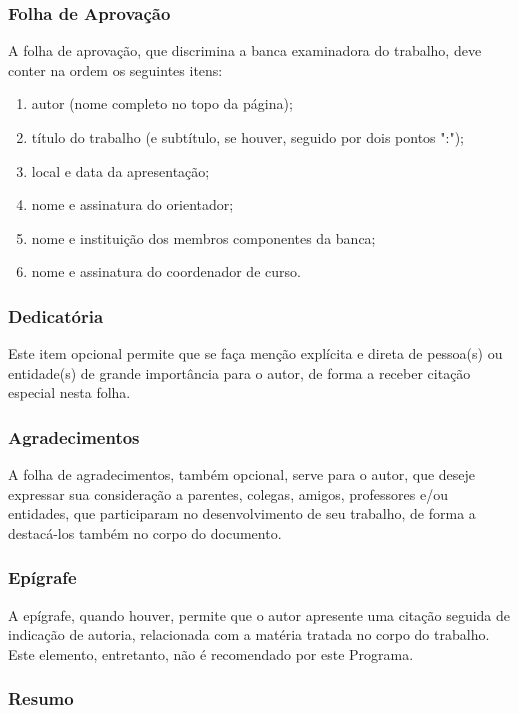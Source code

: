 \documentclass[repeatfields,xlists,xpacks,oneside]{ufrgscca}
\begin{document}
\subsubsection{Folha de Aprovação}

A folha de aprovação, que discrimina a banca examinadora do trabalho, deve
conter na ordem os seguintes itens:

\begin{enumerate}
\item autor (nome completo no topo da página);
\item título do trabalho (e subtítulo, se houver, seguido por dois pontos ":");
\item local e data da apresentação;
\item nome e assinatura do orientador;
\item nome e instituição dos membros componentes da banca;
\item nome e assinatura do coordenador de curso.
\end{enumerate}

\subsubsection{Dedicatória}

Este item opcional permite que se faça menção explícita e direta de
pessoa(s) ou entidade(s) de grande importância para o autor, de forma a
receber citação especial nesta folha.

\subsubsection{Agradecimentos}

A folha de agradecimentos, também opcional, serve para o autor, que deseje
expressar sua consideração a parentes, colegas, amigos, professores e/ou
entidades, que participaram no desenvolvimento de seu trabalho, de forma a
destacá-los também no corpo do documento.

\subsubsection{Epígrafe}

A epígrafe, quando houver, permite que o autor apresente uma citação seguida
de indicação de autoria, relacionada com a matéria tratada no corpo do
trabalho. Este elemento, entretanto, não é recomendado por este Programa.

\subsubsection{Resumo}
\end{document}
